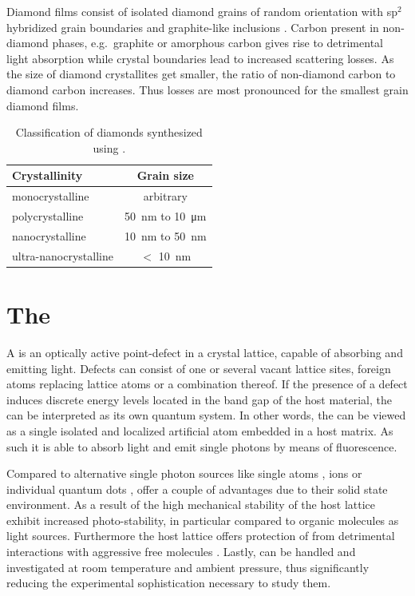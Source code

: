     Diamond films consist of isolated diamond grains of random orientation with sp$^2$ hybridized grain boundaries and graphite-like inclusions \cite{Riedrich-moller2014}. Carbon present in non-diamond phases, e.g.\ graphite or amorphous carbon gives rise to detrimental light absorption while crystal boundaries lead to increased scattering losses. As the size of diamond crystallites get smaller, the ratio of non-diamond carbon to diamond carbon increases. Thus losses are most pronounced for the smallest grain diamond films. 

    \begin{table}[htbp]
  		\centering
  		\caption[Classification of diamond synthesized by \cvd]{Classification of diamonds synthesized using \CVD \cite{Steinmetz2011}.} \label{tab::diamond_grain_sizes}
  			\begin{tabular}{lc}
  			\toprule
  			Crystallinity & Grain size  \\
  			\midrule
  			monocrystalline & arbitrary \\
  			polycrystalline & \SI{50}{\nm} to \SI{10}{\micro\meter} \\
  			nanocrystalline & \SI{10}{\nm} to \SI{50}{\nm} \\
  			ultra-nanocrystalline & $<$ \SI{10}{\nm} \\
  			\bottomrule
  			\end{tabular}
  	\end{table}

\section{The \Sivc} \label{sec::siv}

  A \cc is an optically active point-defect in a crystal lattice, capable of absorbing and emitting light. Defects can consist of one or several vacant lattice sites, foreign atoms replacing lattice atoms or a combination thereof. If the presence of a defect induces discrete energy levels located in the band gap of the host material, the \cc can be interpreted as its own quantum system. In other words, the \cc can be viewed as a single isolated and localized artificial atom embedded in a host matrix. As such it is able to absorb light and emit single photons by means of fluorescence.

  Compared to alternative single photon sources like single atoms \cite{Kuhn2002}, ions \cite{Keller2004} or individual quantum dots \cite{Michler2000, Yuan2002}, \ccs offer a couple of advantages due to their solid state environment. As a result of the high mechanical stability of the host lattice \ccs exhibit increased photo-stability, in particular compared to organic molecules as light sources. Furthermore the host lattice offers protection of \ccs from detrimental interactions with aggressive free molecules \cite{Lounis2005}. Lastly, \ccs can be handled and investigated at room temperature and ambient pressure, thus significantly reducing the experimental sophistication necessary to study them.

